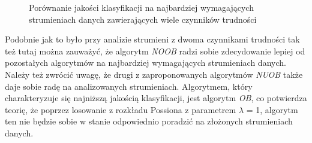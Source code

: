 \begin{figure}[h]
    \centering
    \qquad
    \caption{Porównanie jakości klasyfikacji na najbardziej wymagających strumieniach danych zawierających wiele czynników trudności}\label{Figure:ComplexComparison}
\end{figure}

\noindent Podobnie jak to było przy analizie strumieni z dwoma czynnikami trudności tak też tutaj można zauważyć, że algorytm \textit{NOOB} radzi sobie zdecydowanie lepiej od pozostałych algorytmów na najbardziej wymagających strumieniach danych. Należy też zwrócić uwagę, że drugi z zaproponowanych algorytmów \textit{NUOB} także daje sobie radę na analizowanych strumieniach. Algorytmem, który charakteryzuje się najniższą jakością klasyfikacji, jest algorytm \textit{OB}, co potwierdza teorię, że poprzez losowanie z rozkładu Possiona z parametrem $\lambda$ = 1, algorytm ten nie będzie sobie w stanie odpowiednio poradzić na złożonych strumieniach danych.

